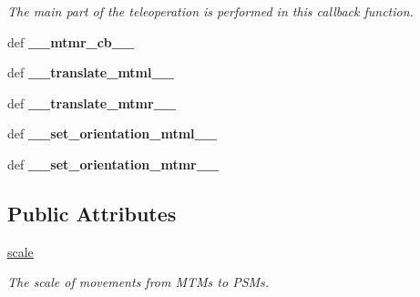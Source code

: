 \begin{DoxyCompactItemize}
\begin{DoxyCompactList}\small\item\em The main part of the teleoperation is performed in this callback function. \end{DoxyCompactList}\item 
\hypertarget{classcamera__control__node_1_1Teleop__class_a5ec0dd8b9519a916fab0134d47b2b582}{def {\bfseries \-\_\-\-\_\-mtmr\-\_\-cb\-\_\-\-\_\-}}\label{classcamera__control__node_1_1Teleop__class_a5ec0dd8b9519a916fab0134d47b2b582}

\item 
\hypertarget{classcamera__control__node_1_1Teleop__class_ab23e1cbbb273a6bb791525a7699a390f}{def {\bfseries \-\_\-\-\_\-translate\-\_\-mtml\-\_\-\-\_\-}}\label{classcamera__control__node_1_1Teleop__class_ab23e1cbbb273a6bb791525a7699a390f}

\item 
\hypertarget{classcamera__control__node_1_1Teleop__class_a05f11974276832eb7bbde4cc2bc64458}{def {\bfseries \-\_\-\-\_\-translate\-\_\-mtmr\-\_\-\-\_\-}}\label{classcamera__control__node_1_1Teleop__class_a05f11974276832eb7bbde4cc2bc64458}

\item 
\hypertarget{classcamera__control__node_1_1Teleop__class_a3c7c891e085be33db256a0781ea485a4}{def {\bfseries \-\_\-\-\_\-set\-\_\-orientation\-\_\-mtml\-\_\-\-\_\-}}\label{classcamera__control__node_1_1Teleop__class_a3c7c891e085be33db256a0781ea485a4}

\item 
\hypertarget{classcamera__control__node_1_1Teleop__class_af391e17fef93c81ddc1fd44f71263d79}{def {\bfseries \-\_\-\-\_\-set\-\_\-orientation\-\_\-mtmr\-\_\-\-\_\-}}\label{classcamera__control__node_1_1Teleop__class_af391e17fef93c81ddc1fd44f71263d79}

\end{DoxyCompactItemize}
\subsection*{Public Attributes}
\begin{DoxyCompactItemize}
\item 
\hypertarget{classcamera__control__node_1_1Teleop__class_abb206f73fc0f76fa869f6e27d62bc728}{\hyperlink{classcamera__control__node_1_1Teleop__class_abb206f73fc0f76fa869f6e27d62bc728}{scale}}\label{classcamera__control__node_1_1Teleop__class_abb206f73fc0f76fa869f6e27d62bc728}

\begin{DoxyCompactList}\small\item\em The scale of movements from M\-T\-Ms to P\-S\-Ms. \end{DoxyCompactList}\end{DoxyCompactItemize}


